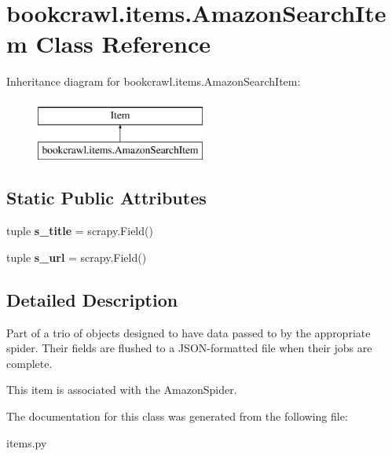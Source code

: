 \hypertarget{classbookcrawl_1_1items_1_1AmazonSearchItem}{}\section{bookcrawl.\+items.\+Amazon\+Search\+Item Class Reference}
\label{classbookcrawl_1_1items_1_1AmazonSearchItem}
Inheritance diagram for bookcrawl.\+items.\+Amazon\+Search\+Item\+:\begin{figure}[H]
\begin{center}
\leavevmode
\includegraphics[height=2.000000cm]{classbookcrawl_1_1items_1_1AmazonSearchItem}
\end{center}
\end{figure}
\subsection*{Static Public Attributes}
\begin{DoxyCompactItemize}
\item 
\hypertarget{classbookcrawl_1_1items_1_1AmazonSearchItem_af9930b289b228a244fe6632015da26fd}{}tuple {\bfseries s\+\_\+title} = scrapy.\+Field()\label{classbookcrawl_1_1items_1_1AmazonSearchItem_af9930b289b228a244fe6632015da26fd}

\item 
\hypertarget{classbookcrawl_1_1items_1_1AmazonSearchItem_a4765956fc47e581851e5ad70917c1773}{}tuple {\bfseries s\+\_\+url} = scrapy.\+Field()\label{classbookcrawl_1_1items_1_1AmazonSearchItem_a4765956fc47e581851e5ad70917c1773}

\end{DoxyCompactItemize}


\subsection{Detailed Description}
\begin{DoxyVerb}Part of a trio of objects designed to have data passed to
by the appropriate spider. Their fields are flushed to
a JSON-formatted file when their jobs are complete.

This item is associated with the AmazonSpider.
\end{DoxyVerb}
 

The documentation for this class was generated from the following file\+:\begin{DoxyCompactItemize}
\item 
items.\+py\end{DoxyCompactItemize}
